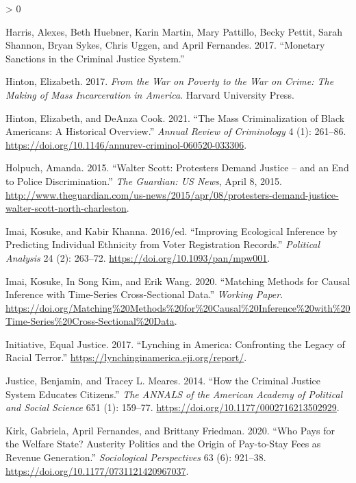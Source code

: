 \documentclass[
  12pt,
]{article}
\newlength{\cslhangindent}
\newenvironment{CSLReferences}[2] %
 {%
  \setlength{\parindent}{0pt}
  \ifodd #1 \everypar{\setlength{\hangindent}{\cslhangindent}}\ignorespaces\fi
  \ifnum #2 > 0
  \setlength{\parskip}{#2\baselineskip}
  \fi
 }%
 {}
\begin{document}
\begin{CSLReferences}{1}{0}
\leavevmode\hypertarget{ref-Harris2017}{}%
Harris, Alexes, Beth Huebner, Karin Martin, Mary Pattillo, Becky Pettit, Sarah Shannon, Bryan Sykes, Chris Uggen, and April Fernandes. 2017. {``Monetary {Sanctions} in the {Criminal Justice System}.''}

\leavevmode\hypertarget{ref-Hinton2017}{}%
Hinton, Elizabeth. 2017. \emph{From the {War} on {Poverty} to the {War} on {Crime}: {The Making} of {Mass Incarceration} in {America}}. {Harvard University Press}.

\leavevmode\hypertarget{ref-Hinton2021}{}%
Hinton, Elizabeth, and DeAnza Cook. 2021. {``The {Mass Criminalization} of {Black Americans}: {A Historical Overview}.''} \emph{Annual Review of Criminology} 4 (1): 261--86. \url{https://doi.org/10.1146/annurev-criminol-060520-033306}.

\leavevmode\hypertarget{ref-Holpuch2015}{}%
Holpuch, Amanda. 2015. {``Walter {Scott}: Protesters Demand Justice -- and an End to Police Discrimination.''} \emph{The Guardian: US News}, April 8, 2015. \url{http://www.theguardian.com/us-news/2015/apr/08/protesters-demand-justice-walter-scott-north-charleston}.

\leavevmode\hypertarget{ref-Imai2016}{}%
Imai, Kosuke, and Kabir Khanna. 2016/ed. {``Improving {Ecological Inference} by {Predicting Individual Ethnicity} from {Voter Registration Records}.''} \emph{Political Analysis} 24 (2): 263--72. \url{https://doi.org/10.1093/pan/mpw001}.

\leavevmode\hypertarget{ref-Imai2020}{}%
Imai, Kosuke, In Song Kim, and Erik Wang. 2020. {``Matching {Methods} for {Causal Inference} with {Time}-{Series Cross}-{Sectional Data}.''} \emph{Working Paper}. \url{https://doi.org/Matching\%20Methods\%20for\%20Causal\%20Inference\%20with\%20Time-Series\%20Cross-Sectional\%20Data}.

\leavevmode\hypertarget{ref-EqualJusticeInitiative2017}{}%
Initiative, Equal Justice. 2017. {``Lynching in {America}: {Confronting} the {Legacy} of {Racial Terror}.''} \url{https://lynchinginamerica.eji.org/report/}.

\leavevmode\hypertarget{ref-Justice2014}{}%
Justice, Benjamin, and Tracey L. Meares. 2014. {``How the {Criminal Justice System Educates Citizens}.''} \emph{The ANNALS of the American Academy of Political and Social Science} 651 (1): 159--77. \url{https://doi.org/10.1177/0002716213502929}.

\leavevmode\hypertarget{ref-Kirk2020}{}%
Kirk, Gabriela, April Fernandes, and Brittany Friedman. 2020. {``Who {Pays} for the {Welfare State}? {Austerity Politics} and the {Origin} of {Pay}-to-{Stay Fees} as {Revenue Generation}.''} \emph{Sociological Perspectives} 63 (6): 921--38. \url{https://doi.org/10.1177/0731121420967037}.


\end{CSLReferences}
\end{document}
